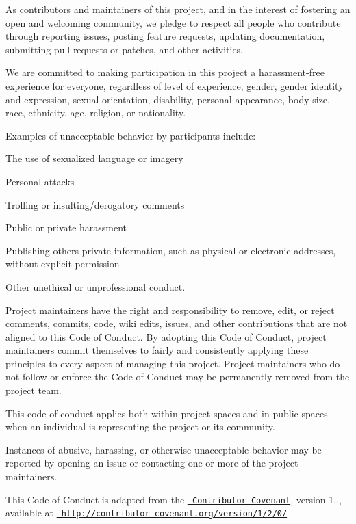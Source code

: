 As contributors and maintainers of this project, and in the interest of fostering an open and welcoming community, we pledge to respect all people who contribute through reporting issues, posting feature requests, updating documentation, submitting pull requests or patches, and other activities.

We are committed to making participation in this project a harassment-\/free experience for everyone, regardless of level of experience, gender, gender identity and expression, sexual orientation, disability, personal appearance, body size, race, ethnicity, age, religion, or nationality.

Examples of unacceptable behavior by participants include\+:


\begin{DoxyItemize}
\item The use of sexualized language or imagery
\item Personal attacks
\item Trolling or insulting/derogatory comments
\item Public or private harassment
\item Publishing other\textquotesingle{}s private information, such as physical or electronic addresses, without explicit permission
\item Other unethical or unprofessional conduct.
\end{DoxyItemize}

Project maintainers have the right and responsibility to remove, edit, or reject comments, commits, code, wiki edits, issues, and other contributions that are not aligned to this Code of Conduct. By adopting this Code of Conduct, project maintainers commit themselves to fairly and consistently applying these principles to every aspect of managing this project. Project maintainers who do not follow or enforce the Code of Conduct may be permanently removed from the project team.

This code of conduct applies both within project spaces and in public spaces when an individual is representing the project or its community.

Instances of abusive, harassing, or otherwise unacceptable behavior may be reported by opening an issue or contacting one or more of the project maintainers.

This Code of Conduct is adapted from the \href{http://contributor-covenant.org}{\texttt{ Contributor Covenant}}, version 1.., available at \href{http://contributor-covenant.org/version/1/2/0/}{\texttt{ http\+://contributor-\/covenant.\+org/version/1/2/0/}} 